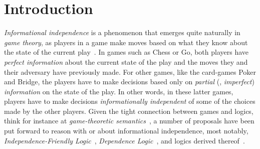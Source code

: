\documentclass[authoryear]{elsarticle}
\begin{document}



\section{Introduction}

\emph{Informational independence} is a phenomenon that emerges quite naturally
in \emph{game theory}, as players in a game make moves based on what they know
about the state of the current play~\citep{NM44}.
%
In games such as Chess or Go, both players have \emph{perfect information} about
the current state of the play and the moves they and their adversary have
previously made.
For other games, like the card-games Poker and Bridge, the players have to make
decisions based only on \emph{partial} (\ie, \emph{imperfect})
\emph{information} on the state of the play.
In other words, in these latter games, players have to make decisions
\emph{informationally independent} of some of the choices made by the other
players.
%
Given the tight connection between games and logics, think for instance at
\emph{game-theoretic semantics}~\citep{Lor61,Lor68,Hin73}, a number of proposals
have been put forward to reason with or about informational independence, most
notably, \emph{Independence-Friendly Logic}~\citep{HS89}, \emph{Dependence
Logic}~\citep{Vaa07}, and logics derived
thereof~\citep{Gal12,GV13a,Kuu13,CGW13,Kuu15}.
\end{document}
